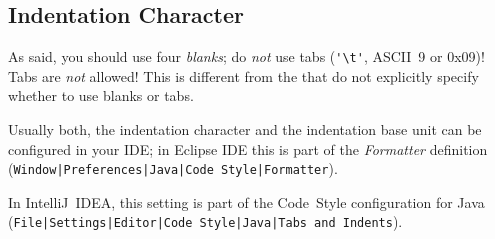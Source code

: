 \subsection{Indentation Character}\label{sec:IndentationCharacter}
As said, you should use four \textit{blanks}; do \textit{not} use tabs (\lstinline|'\t'|, ASCII~9 or 0x09)! Tabs are \textit{not} allowed! This is different from the  \autocite{SUN_CODE_CONVENTIONS:Indentation} that do not explicitly specify whether to use blanks or tabs.

Usually both, the indentation character and the indentation base unit can be configured in your IDE; in Eclipse IDE this is part of the \textit{Formatter} definition (\texttt{Window|Preferences|Java|Code Style|Formatter}).

In IntelliJ~IDEA, this setting is part of the Code~Style configuration for Java (\texttt{File|Settings|Editor|Code Style|Java|Tabs and Indents}).


